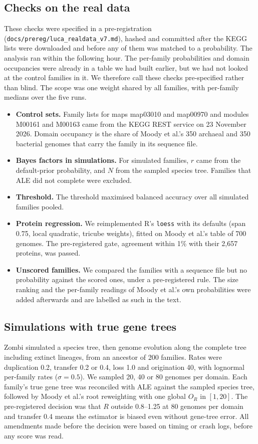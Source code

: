 \documentclass[11pt]{article}
\begin{document}
\subsection{Checks on the real data}
These checks were specified in a pre-registration (\texttt{docs/prereg/luca\_realdata\_v7.md}), hashed and committed after the KEGG lists were downloaded and before any of them was matched to a probability. The analysis ran within the following hour. The per-family probabilities and domain occupancies were already in a table we had built earlier, but we had not looked at the control families in it. We therefore call these checks pre-specified rather than blind. The scope was one weight shared by all families, with per-family medians over the five runs.
\begin{itemize}
  \item \textbf{Control sets.} Family lists for maps map03010 and map00970 and modules M00161 and M00163 came from the KEGG REST service on 23 November 2026. Domain occupancy is the share of Moody et al.'s 350 archaeal and 350 bacterial genomes that carry the family in its sequence file.
  \item \textbf{Bayes factors in simulations.} For simulated families, $r$ came from the default-prior probability, and $N$ from the sampled species tree. Families that ALE did not complete were excluded.
  \item \textbf{Threshold.} The threshold maximised balanced accuracy over all simulated families pooled.
  \item \textbf{Protein regression.} We reimplemented R's \texttt{loess} with its defaults (span 0.75, local quadratic, tricube weights), fitted on Moody et al.'s table of 700 genomes. The pre-registered gate, agreement within 1\% with their 2,657 proteins, was passed.
  \item \textbf{Unscored families.} We compared the families with a sequence file but no probability against the scored ones, under a pre-registered rule. The size ranking and the per-family readings of Moody et al.'s own probabilities were added afterwards and are labelled as such in the text.
\end{itemize}

\subsection{Simulations with true gene trees}
Zombi simulated a species tree, then genome evolution along the complete tree including extinct lineages, from an ancestor of 200 families. Rates were duplication 0.2, transfer 0.2 or 0.4, loss 1.0 and origination 40, with lognormal per-family rates ($\sigma = 0.5$). We sampled 20, 40 or 80 genomes per domain. Each family's true gene tree was reconciled with ALE against the sampled species tree, followed by Moody et al.'s root reweighting with one global $O_R$ in $[1, 20]$. The pre-registered decision was that $R$ outside 0.8--1.25 at 80 genomes per domain and transfer 0.4 means the estimator is biased even without gene-tree error. All amendments made before the decision were based on timing or crash logs, before any score was read.
\end{document}
